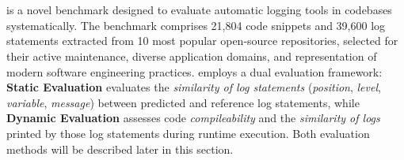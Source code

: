 \section{\methodname}
\label{sec:method}
\methodname is a novel benchmark designed to evaluate automatic logging tools in codebases systematically. The benchmark comprises 21,804 code snippets and 39,600 log statements extracted from 10 most popular open-source repositories, selected for their active maintenance, diverse application domains, and representation of modern software engineering practices. \methodname employs a dual evaluation framework: \textbf{Static Evaluation} evaluates the \textit{similarity of log statements} (\eg \textit{position}, \textit{level}, \textit{variable}, \textit{message}) between predicted and reference log statements, while \textbf{Dynamic Evaluation} assesses code \textit{compileability} and the \textit{similarity of logs} printed by those log statements during runtime execution. Both evaluation methods will be described later in this section.










